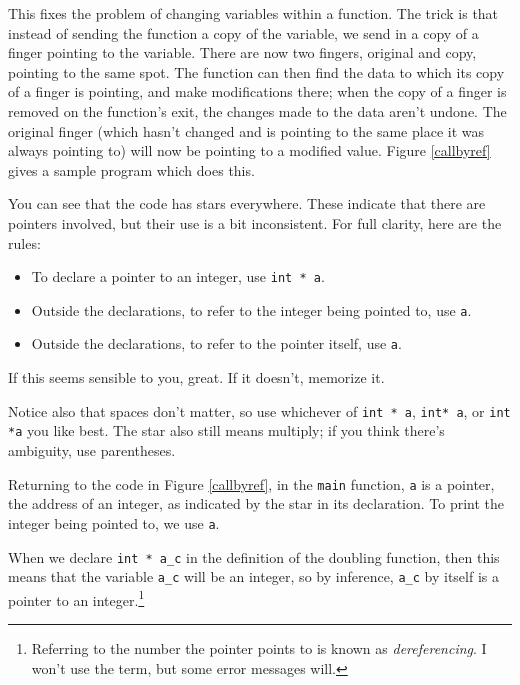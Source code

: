 \documentclass[12pt]{article}
\begin{document}
This fixes the problem of changing variables within a function. The
trick is that instead of sending the function a copy of the variable,
we send in a copy of a finger pointing to the variable. There are now
two fingers, original and copy, pointing to the same spot. The
function can then find the data to which its copy of a finger is pointing,
and make modifications there; when the copy of a finger is removed on the
function's exit, the changes made to the data aren't undone.
The original finger (which hasn't changed and is pointing to the same
place it was always pointing to) will now be pointing to a modified value.
Figure \ref{callbyref} gives a sample program which does this.


You can see that the code has stars everywhere. These
indicate that there are pointers involved, but their use is a bit inconsistent.
For full clarity, here are the rules:
\begin{itemize}
\item To declare a pointer to an integer, use {\tt int * a}.
\item Outside the declarations, to refer to the integer being pointed to, use {\tt * a}.
\item Outside the declarations, to refer to the pointer itself, use {\tt a}.
\end{itemize}
If this seems sensible to you, great. If it doesn't, memorize it. 

Notice also that spaces don't matter, so use whichever of {\tt int *
a}, {\tt int* a}, or {\tt int *a} you like best. The star also still means multiply; if you think
there's ambiguity, use parentheses.

Returning to the code in Figure \ref{callbyref}, in the {\tt main} function, {\tt a} is a pointer,
the address of an integer, as indicated by the star in its
declaration. To print the integer being pointed to, we use {\tt *a}. 

When we declare {\tt int * a\_c} in the definition of the doubling
function, then this means that the variable {\tt *a\_c} will be an
integer, so by inference, {\tt a\_c} by itself is a pointer to an
integer.\footnote{Referring to the number the pointer points to is
known as {\sl dereferencing}. I won't use the term, but some error
messages will.}
\end{document}
